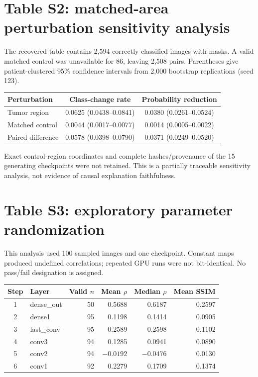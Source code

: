 \documentclass[10pt]{article}
\begin{document}
\section*{Table S2: matched-area perturbation sensitivity analysis}
The recovered table contains 2,594 correctly classified images with masks. A valid matched control was unavailable for 86, leaving 2,508 pairs. Parentheses give patient-clustered 95\% confidence intervals from 2,000 bootstrap replications (seed 123).
\begin{center}
\begin{tabular}{lcc}
\toprule
Perturbation & Class-change rate & Probability reduction \\
\midrule
Tumor region & 0.0625 (0.0438--0.0841) & 0.0380 (0.0261--0.0524)\\
Matched control & 0.0044 (0.0017--0.0077) & 0.0014 (0.0005--0.0022)\\
Paired difference & 0.0578 (0.0398--0.0790) & 0.0371 (0.0249--0.0520)\\
\bottomrule
\end{tabular}
\end{center}
Exact control-region coordinates and complete hashes/provenance of the 15 generating checkpoints were not retained. This is a partially traceable sensitivity analysis, not evidence of causal explanation faithfulness.

\section*{Table S3: exploratory parameter randomization}
This analysis used 100 sampled images and one checkpoint. Constant maps produced undefined correlations; repeated GPU runs were not bit-identical. No pass/fail designation is assigned.
\begin{center}\small
\begin{tabular}{clrrrr}
\toprule
Step & Layer & Valid $n$ & Mean $\rho$ & Median $\rho$ & Mean SSIM\\
\midrule
1&dense\_out&50&0.5688&0.6187&0.2597\\
2&dense1&95&0.1198&0.1414&0.0905\\
3&last\_conv&95&0.2589&0.2598&0.1102\\
4&conv3&94&0.1285&0.0941&0.0890\\
5&conv2&94&$-0.0192$&$-0.0476$&0.0130\\
6&conv1&92&0.2279&0.1709&0.1374\\
\bottomrule
\end{tabular}
\end{center}
\end{document}
